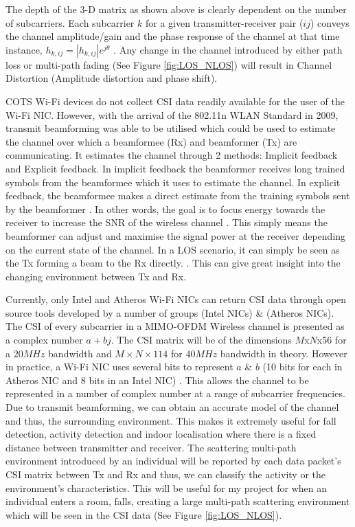 The depth of the 3-D matrix as shown above is clearly dependent on the number of subcarriers. Each subcarrier $k$ for a given transmitter-receiver pair ($ij$) conveys the channel amplitude/gain and the phase response of the channel at that time instance, $h_{k,ij} = |h_{k,ij}|e^{j\theta}$ \citep{OFDM}. Any change in the channel introduced by either path loss or multi-path fading (See Figure \ref{fig:LOS_NLOS}) will result in Channel Distortion (Amplitude distortion and phase shift).\par 
COTS Wi-Fi devices do not collect CSI data readily available for the user of the Wi-Fi NIC. However, with the arrival of the 802.11n WLAN Standard in 2009, transmit beamforming was able to be utilised which could be used to estimate the channel over which a beamformee (Rx) and beamformer (Tx) are communicating. It estimates the channel through 2 methods: Implicit feedback and Explicit feedback. In implicit feedback the beamformer receives long trained symbols from the beamformee which it uses to estimate the channel. In explicit feedback, the beamformee makes a direct estimate from the training symbols sent by the beamformer \citep{full802.11nStandard}. In other words, the goal is to focus energy towards the receiver to increase the SNR of the wireless channel \citep{beamforming}. This simply means the beamformer can adjust and maximise the signal power at the receiver depending on the current state of the channel. In a LOS scenario, it can simply be seen as the Tx forming a beam to the Rx directly. \citep{beamforming}. This can give great insight into the changing environment between Tx and Rx. \par
Currently, only Intel and Atheros Wi-Fi NICs can return CSI data through open source tools developed by a number of groups \citep{Halperin_csitool} (Intel NICs) \& \citep{Xie:2015:PPD:2789168.2790124} (Atheros NICs). The CSI of every subcarrier in a MIMO-OFDM Wireless channel is presented as a complex number $a+bj$. The CSI matrix will be of the dimensions $M$x$N$x56 for a $20MHz$ bandwidth and $M\times N\times 114$ for $40MHz$ bandwidth in theory. However in practice, a Wi-Fi NIC uses several bits to represent $a$ \& $b$ (10 bits for each in Atheros NIC and 8 bits in an Intel NIC) \citep{Xie:2015:PPD:2789168.2790124}. This allows the channel to be represented in a number of complex number at a range of subcarrier frequencies. Due to transmit beamforming, we can obtain an accurate model of the channel and thus, the surrounding environment. This makes it extremely useful for fall detection, activity detection and indoor localisation where there is a fixed distance between transmitter and receiver. The scattering multi-path environment introduced by an individual will be reported by each data packet's CSI matrix between Tx and Rx and thus, we can classify the activity or the environment's characteristics. This will be useful for my project for when an individual enters a room, falls, creating a large multi-path scattering environment which will be seen in the CSI data (See Figure \ref{fig:LOS_NLOS}).


